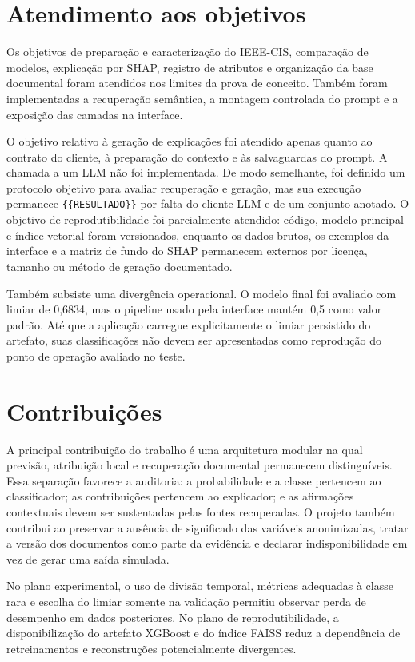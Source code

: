 \section{Atendimento aos objetivos}

Os objetivos de preparação e caracterização do IEEE-CIS, comparação de modelos, explicação por SHAP, registro de atributos e organização da base documental foram atendidos nos limites da prova de conceito. Também foram implementadas a recuperação semântica, a montagem controlada do prompt e a exposição das camadas na interface.

O objetivo relativo à geração de explicações foi atendido apenas quanto ao contrato do cliente, à preparação do contexto e às salvaguardas do prompt. A chamada a um LLM não foi implementada. De modo semelhante, foi definido um protocolo objetivo para avaliar recuperação e geração, mas sua execução permanece \texttt{\{\{RESULTADO\}\}} por falta do cliente LLM e de um conjunto anotado. O objetivo de reprodutibilidade foi parcialmente atendido: código, modelo principal e índice vetorial foram versionados, enquanto os dados brutos, os exemplos da interface e a matriz de fundo do SHAP permanecem externos por licença, tamanho ou método de geração documentado.

Também subsiste uma divergência operacional. O modelo final foi avaliado com limiar de 0,6834, mas o pipeline usado pela interface mantém 0,5 como valor padrão. Até que a aplicação carregue explicitamente o limiar persistido do artefato, suas classificações não devem ser apresentadas como reprodução do ponto de operação avaliado no teste.

\section{Contribuições}

A principal contribuição do trabalho é uma arquitetura modular na qual previsão, atribuição local e recuperação documental permanecem distinguíveis. Essa separação favorece a auditoria: a probabilidade e a classe pertencem ao classificador; as contribuições pertencem ao explicador; e as afirmações contextuais devem ser sustentadas pelas fontes recuperadas. O projeto também contribui ao preservar a ausência de significado das variáveis anonimizadas, tratar a versão dos documentos como parte da evidência e declarar indisponibilidade em vez de gerar uma saída simulada.

No plano experimental, o uso de divisão temporal, métricas adequadas à classe rara e escolha do limiar somente na validação permitiu observar perda de desempenho em dados posteriores. No plano de reprodutibilidade, a disponibilização do artefato XGBoost e do índice FAISS reduz a dependência de retreinamentos e reconstruções potencialmente divergentes.

